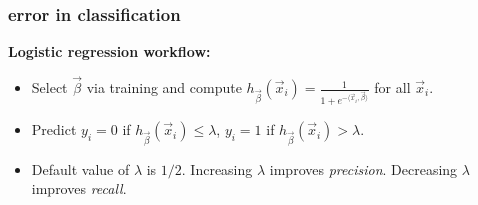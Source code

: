 \documentclass[handout,compress]{beamer}
\begin{document}
\begin{frame}
	\frametitle{error in classification}
	\textbf{Logistic regression workflow:}
	\begin{itemize}
		\item Select $\vec{\beta}$ via training and compute $h_{\vec{\beta}}(\vec{x}_i) = \frac{1}{1 + e^{-\langle\vec{x}_i,\vec{\beta}\rangle}}$ for all $\vec{x}_i$.
		\item Predict $y_i = 0$ if  $h_{\vec{\beta}}(\vec{x}_i)  \leq \lambda$, $y_i = 1$ if  $h_{\vec{\beta}}(\vec{x}_i)  > \lambda$.
		\item Default value of $\lambda$ is $1/2$. Increasing $\lambda$ improves \emph{precision}. Decreasing $\lambda$ improves \emph{recall}.
	\end{itemize}
\end{frame}
\end{document}

